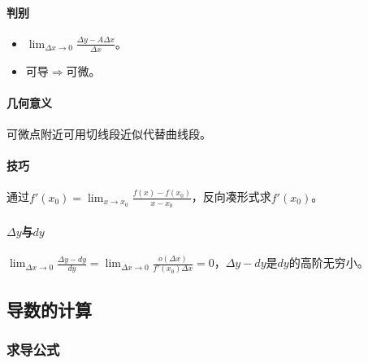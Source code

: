 \documentclass[
12pt, %
a4paper, 
oneside, %
]{scrartcl}
\begin{document}
\paragraph{判别}
\begin{itemize}
\item $ \lim_{\Delta x \to 0} \frac{\Delta y - A \Delta x}{\Delta x} $。
\item 可导$ \Rightarrow $可微。
\end{itemize}
\paragraph{几何意义}
可微点附近可用切线段近似代替曲线段。
\paragraph{技巧}
通过$ f'(x_0) = \lim_{x \to x_0} \frac{f(x)-f(x_0)}{x - x_0} $，反向凑形式求$ f'(x_0) $。
\paragraph{$ \Delta y $与$ d y $}
$ \lim_{\Delta x \to 0} \frac{\Delta y - d y}{d y} = \lim_{\Delta x \to 0} \frac{o(\Delta x)}{f'(x_0)\Delta x} = 0 $，$ \Delta y - d y $是$ d y $的高阶无穷小。
\subsection[导数的计算]{导数的计算}
\subsubsection[求导公式]{求导公式}
\end{document}
